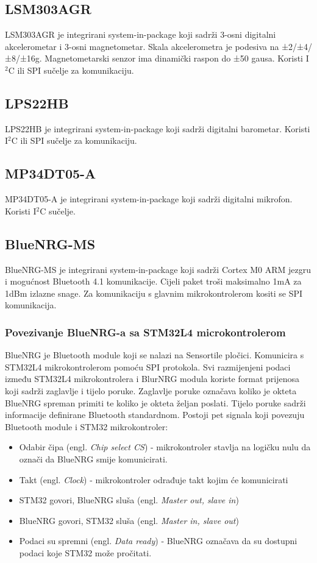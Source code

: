 \documentclass[times, utf8, diplomski]{diplomski}
\begin{document}
\subsection{LSM303AGR}
LSM303AGR je integrirani system-in-package koji sadrži 3-osni digitalni akcelerometar i 3-osni magnetometar. Skala akcelerometra je podesiva na
±2/±4/±8/±16g. Magnetometarski senzor ima dinamički raspon do ±50 gausa. Koristi I\(^2\)C ili SPI sučelje za komunikaciju.

\subsection{LPS22HB}
LPS22HB je integrirani system-in-package koji sadrži digitalni barometar. Koristi I\(^2\)C ili SPI sučelje za komunikaciju.

\subsection{MP34DT05-A}
MP34DT05-A je integrirani system-in-package koji sadrži digitalni mikrofon. Koristi I\(^2\)C sučelje.

\subsection{BlueNRG-MS}
BlueNRG-MS \cite{BlueNrgMs} je integrirani system-in-package koji sadrži Cortex M0 ARM jezgru i mogućnost Bluetooth 4.1 komunikacije.
Cijeli paket troši maksimalno 1mA za 1dBm izlazne snage. Za komunikaciju s glavnim mikrokontrolerom kositi se SPI komunikacija.

\subsubsection{Povezivanje BlueNRG-a sa STM32L4 microkontrolerom}
BlueNRG je Bluetooth module koji se nalazi na Sensortile pločici. Komunicira s STM32L4 mikrokontrolerom pomoću SPI protokola.
Svi razmijenjeni podaci između STM32L4 mikrokontrolera i BlurNRG modula koriste format prijenosa koji sadrži zaglavlje i tijelo poruke.
Zaglavlje poruke označava koliko je okteta BlueNRG spreman primiti te koliko je okteta željan poslati. Tijelo poruke sadrži informacije definirane Bluetooth standardnom.
Postoji pet signala koji povezuju Bluetooth module i STM32 mikrokontroler:

\begin{itemize}
  \item Odabir čipa (engl. \textit{Chip select CS}) - mikrokontroler stavlja na logičku nulu da označi da BlueNRG smije komunicirati.
  \item Takt (engl. \textit{Clock}) - mikrokontroler odrađuje takt kojim će komunicirati
  \item STM32 govori, BlueNRG sluša (engl. \textit{Master out, slave in})
  \item BlueNRG govori, STM32 sluša (engl. \textit{Master in, slave out})
  \item Podaci su spremni (engl. \textit{Data ready}) - BlueNRG označava da su dostupni podaci koje STM32 može pročitati.
\end{itemize}
\end{document}
